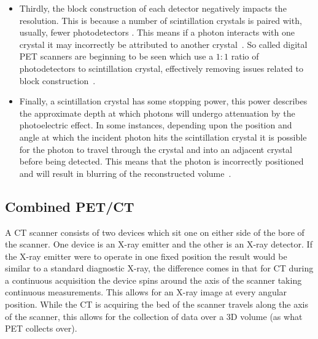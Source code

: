 \begin{itemize}
                    \item Thirdly, the block construction of each detector negatively impacts the resolution. This is because a number of scintillation crystals is paired with, usually, fewer photodetectors %
                    . This means if a photon interacts with one crystal it may incorrectly be attributed to another crystal~. So called digital \gls{PET} scanners are beginning to be seen which use a $1:1$ ratio of photodetectors to scintillation crystal, effectively removing issues related to block construction~.
                    
                    \item Finally, %
                    a scintillation crystal has some stopping power, this power describes the approximate depth at which photons will undergo attenuation by the photoelectric effect. In some instances, depending upon the position and angle at which the incident photon hits the scintillation crystal it is possible for the photon to travel through the crystal and into an adjacent crystal before being detected. This means that the photon is incorrectly positioned and will result in blurring of the reconstructed volume~.
                \end{itemize}
        
        \subsection{Combined PET/CT} \label{sec:combined_pet_ct}
            A \gls{CT} scanner consists of two devices which sit one on either side of the bore of the scanner. %
            One device is an X-ray emitter and the other is an X-ray detector. If the X-ray emitter were to operate in one fixed position the result would be similar to a standard diagnostic X-ray, the difference comes in that for \gls{CT} during a continuous acquisition the device spins around the axis of the scanner taking continuous measurements. This allows for an X-ray image at every angular position. While the \gls{CT} is acquiring the bed of the scanner travels along the axis of the scanner, %
            this allows for the collection of data over a \gls{3D} volume (as what \gls{PET} collects over).
            
